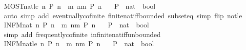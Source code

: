 \begin{isabellebody}
\endisatagproof
{\isafoldproof}%
%
\isadelimproof
\isanewline
%
\endisadelimproof
\isanewline
{}\isamarkupfalse%
\ MOST{\isacharunderscore}nat{\isacharunderscore}le{\isacharcolon}\ {\isachardoublequoteopen}{\isacharparenleft}{\isasymforall}\isactrlsub {\isasyminfinity}n{\isachardot}\ P\ n{\isacharparenright}\ {\isasymlongleftrightarrow}\ {\isacharparenleft}{\isasymexists}m{\isachardot}\ {\isasymforall}n{\isasymge}m{\isachardot}\ P\ n{\isacharparenright}{\isachardoublequoteclose}\isanewline
\ \ \ P\ {\isacharcolon}{\isacharcolon}\ {\isachardoublequoteopen}nat\ {\isasymRightarrow}\ bool{\isachardoublequoteclose}\isanewline
%
\isadelimproof
\ \ %
\endisadelimproof
%
\isatagproof
{}\isamarkupfalse%
\ {\isacharparenleft}auto\ simp\ add{\isacharcolon}\ eventually{\isacharunderscore}cofinite\ finite{\isacharunderscore}nat{\isacharunderscore}iff{\isacharunderscore}bounded\ subset{\isacharunderscore}eq\ simp\ flip{\isacharcolon}\ not{\isacharunderscore}le{\isacharparenright}%
\endisatagproof
{\isafoldproof}%
%
\isadelimproof
\isanewline
%
\endisadelimproof
\isanewline
{}\isamarkupfalse%
\ INFM{\isacharunderscore}nat{\isacharcolon}\ {\isachardoublequoteopen}{\isacharparenleft}{\isasymexists}\isactrlsub {\isasyminfinity}n{\isachardot}\ P\ n{\isacharparenright}\ {\isasymlongleftrightarrow}\ {\isacharparenleft}{\isasymforall}m{\isachardot}\ {\isasymexists}n{\isachargreater}m{\isachardot}\ P\ n{\isacharparenright}{\isachardoublequoteclose}\isanewline
\ \ \ P\ {\isacharcolon}{\isacharcolon}\ {\isachardoublequoteopen}nat\ {\isasymRightarrow}\ bool{\isachardoublequoteclose}\isanewline
%
\isadelimproof
\ \ %
\endisadelimproof
%
\isatagproof
{}\isamarkupfalse%
\ {\isacharparenleft}simp\ add{\isacharcolon}\ frequently{\isacharunderscore}cofinite\ infinite{\isacharunderscore}nat{\isacharunderscore}iff{\isacharunderscore}unbounded{\isacharparenright}%
\endisatagproof
{\isafoldproof}%
%
\isadelimproof
\isanewline
%
\endisadelimproof
\isanewline
{}\isamarkupfalse%
\ INFM{\isacharunderscore}nat{\isacharunderscore}le{\isacharcolon}\ {\isachardoublequoteopen}{\isacharparenleft}{\isasymexists}\isactrlsub {\isasyminfinity}n{\isachardot}\ P\ n{\isacharparenright}\ {\isasymlongleftrightarrow}\ {\isacharparenleft}{\isasymforall}m{\isachardot}\ {\isasymexists}n{\isasymge}m{\isachardot}\ P\ n{\isacharparenright}{\isachardoublequoteclose}\isanewline
\ \ \ P\ {\isacharcolon}{\isacharcolon}\ {\isachardoublequoteopen}nat\ {\isasymRightarrow}\ bool{\isachardoublequoteclose}\isanewline

\end{isabellebody}
